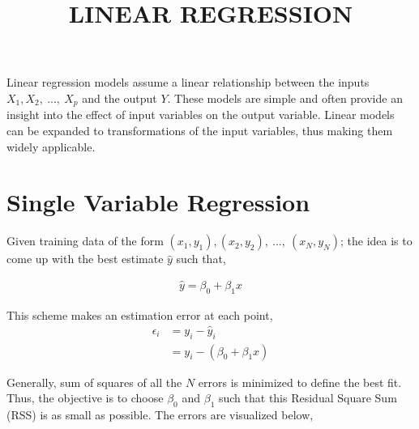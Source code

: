 \documentclass[11pt, a4paper]{article}
\begin{document}
\title{LINEAR REGRESSION}
\date{}
\maketitle

Linear regression models assume a linear relationship between the inputs $X_1, X_2,\ ...,\ X_p$ and the output $Y$. These models are simple and often provide an insight into the effect of input variables on the output variable.
Linear models can be expanded to transformations of the input variables, thus making them widely applicable.

\section{Single Variable Regression}

Given training data of the form $(x_1, y_1), (x_2, y_2),\ ...,\ (x_N, y_N)$; the idea is to come up with the best estimate $\hat{y}$ such that, 

\begin{align*}
	\hat{y} = \beta_0 + \beta_1x 
\end{align*}

This scheme makes an estimation error at each point,
\begin{align*}
	\epsilon_i & = y_i - \hat{y}_i            \\
	           & = y_i - (\beta_0 + \beta_1x) 
\end{align*}

Generally, sum of squares of all the $N$ errors is minimized to define the best fit. Thus, the objective is to choose $\beta_0$ and $\beta_1$ such that this Residual Square Sum (RSS) is as small as possible. The errors are visualized below,

\begin{figure}[htbp]
	\centering
\end{figure}
\end{document}
